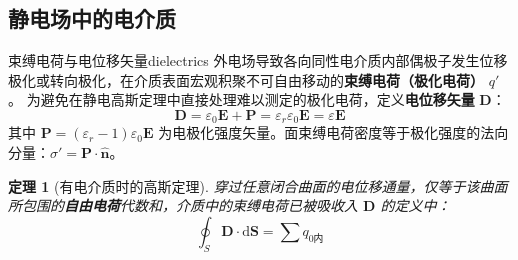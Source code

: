 \documentclass[11pt,a4paper,fontset=fandol]{ctexart}
\newtheorem{theorem}{定理}[section]
\theoremstyle{remark}
\begin{document}
\subsection{静电场中的电介质}

\begin{definition}{束缚电荷与电位移矢量}{dielectrics}
外电场导致各向同性电介质内部偶极子发生位移极化或转向极化，在介质表面宏观积聚不可自由移动的\textbf{束缚电荷（极化电荷）} $q'$。
为避免在静电高斯定理中直接处理难以测定的极化电荷，定义\textbf{电位移矢量} $\bm{D}$：
\begin{equation}
    \bm{D} = \varepsilon_0 \bm{E} + \bm{P} = \varepsilon_r \varepsilon_0 \bm{E} = \varepsilon \bm{E}
\end{equation}
其中 $\bm{P} = (\varepsilon_r - 1)\varepsilon_0 \bm{E}$ 为电极化强度矢量。面束缚电荷密度等于极化强度的法向分量：$\sigma' = \bm{P}\cdot\hat{\bm{n}}$。
\end{definition}

\begin{theorem}[有电介质时的高斯定理]
穿过任意闭合曲面的电位移通量，仅等于该曲面所包围的\textbf{自由电荷}代数和，介质中的束缚电荷已被吸收入 $\bm{D}$ 的定义中：
\begin{equation}
    \oint_S \bm{D} \cdot \mathrm{d}\bm{S} = \sum q_{0\text{内}}
\end{equation}
\end{theorem}
\end{document}
